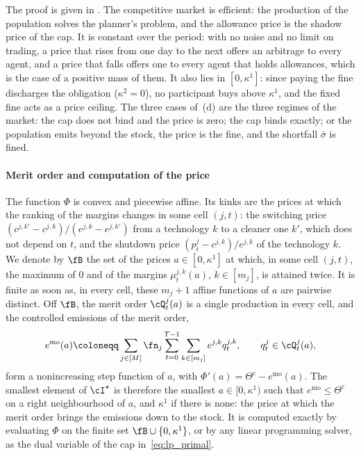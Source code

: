     The proof is given in . The competitive market is efficient: the production of the population solves the planner's problem, and the allowance price is the shadow price of the cap. It is constant over the period: with no noise and no limit on trading, a price that rises from one day to the next offers an arbitrage to every agent, and a price that falls offers one to every agent that holds allowances, which is the case of a positive mass of them. It also lies in $[0, \kappa^1]$: since paying the fine discharges the obligation ($\kappa^2 = 0$), no participant buys above $\kappa^1$, and the fixed fine acts as a price ceiling. The three cases of~(d) are the three regimes of the market: the cap does not bind and the price is zero; the cap binds exactly; or the population emits beyond the stock, the price is the fine, and the shortfall $\bar\sigma$ is fined.

    \paragraph{Merit order and computation of the price} The function $\Phi$ is convex and piecewise affine. Its kinks are the prices at which the ranking of the margins changes in some cell $(j,t)$: the switching price $(c^{j,k'} - c^{j,k})/(e^{j,k} - e^{j,k'})$ from a technology $k$ to a cleaner one $k'$, which does not depend on $t$, and the shutdown price $(p^j_t - c^{j,k})/e^{j,k}$ of the technology $k$. We denote by $\fB$ the set of the prices $a \in [0, \kappa^1]$ at which, in some cell $(j,t)$, the maximum of $0$ and of the margins $\mu^{j,k}_t(a)$, $k \in [m_j]$, is attained twice. It is finite as soon as, in every cell, these $m_j + 1$ affine functions of $a$ are pairwise distinct. Off $\fB$, the merit order $\cQ^j_t(a)$ is a single production in every cell, and the controlled emissions of the merit order,
    $$
        e^{\mathrm{mo}}(a) \coloneqq \sum_{j \in [M]} \fn_j \sum_{t=0}^{T-1} \sum_{k \in [m_j]} e^{j,k} q^{j,k}_t, \qquad q^j_t \in \cQ^j_t(a),
    $$
    form a nonincreasing step function of $a$, with $\Phi'(a) = \Theta^{\mathrm c} - e^{\mathrm{mo}}(a)$. The smallest element of $\cI^\star$ is therefore the smallest $a \in [0, \kappa^1)$ such that $e^{\mathrm{mo}} \le \Theta^{\mathrm c}$ on a right neighbourhood of $a$, and $\kappa^1$ if there is none: the price at which the merit order brings the emissions down to the stock. It is computed exactly by evaluating $\Phi$ on the finite set $\fB \cup \{0, \kappa^1\}$, or by any linear programming solver, as the dual variable of the cap in~\eqref{eq:lp_primal}.


